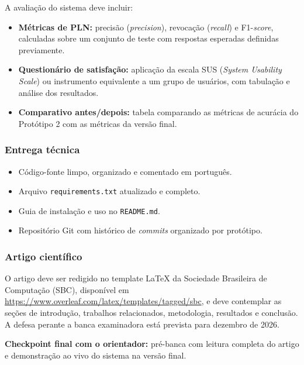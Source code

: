 A avaliação do sistema deve incluir:

\begin{itemize}
    \item \textbf{Métricas de PLN:} precisão (\textit{precision}), revocação (\textit{recall}) e F1-\textit{score}, calculadas sobre um conjunto de teste com respostas esperadas definidas previamente.
    \item \textbf{Questionário de satisfação:} aplicação da escala SUS (\textit{System Usability Scale}) ou instrumento equivalente a um grupo de usuários, com tabulação e análise dos resultados.
    \item \textbf{Comparativo antes/depois:} tabela comparando as métricas de acurácia do Protótipo 2 com as métricas da versão final.
\end{itemize}

\subsubsection{Entrega técnica}

\begin{itemize}
    \item Código-fonte limpo, organizado e comentado em português.
    \item Arquivo \texttt{requirements.txt} atualizado e completo.
    \item Guia de instalação e uso no \texttt{README.md}.
    \item Repositório Git com histórico de \textit{commits} organizado por protótipo.
\end{itemize}

\subsubsection{Artigo científico}

O artigo deve ser redigido no template \LaTeX{} da Sociedade Brasileira de Computação (SBC), disponível em \url{https://www.overleaf.com/latex/templates/tagged/sbc}, e deve contemplar as seções de introdução, trabalhos relacionados, metodologia, resultados e conclusão. A defesa perante a banca examinadora está prevista para dezembro de 2026.

\textbf{Checkpoint final com o orientador:} pré-banca com leitura completa do artigo e demonstração ao vivo do sistema na versão final.
